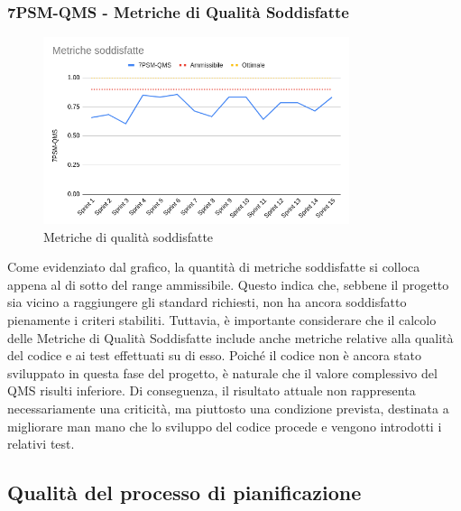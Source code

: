 \documentclass{article}
\begin{document}
        \subsubsection{7PSM-QMS - Metriche di Qualità Soddisfatte}
        \begin{figure}[H]
            \centering
            \includegraphics[width=0.8\textwidth]{../../../img/pdq_charts/chart6-metricheSoddisfatte.png}
            \caption{Metriche di qualità soddisfatte}
        \end{figure}
        Come evidenziato dal grafico, la quantità di metriche soddisfatte si colloca appena al di sotto del range ammissibile. Questo indica che, sebbene il progetto sia vicino a raggiungere gli standard richiesti, non ha ancora soddisfatto pienamente i criteri stabiliti.
        Tuttavia, è importante considerare che il calcolo delle Metriche di Qualità Soddisfatte include anche metriche relative alla qualità del codice e ai test effettuati su di esso. Poiché il codice non è ancora stato sviluppato in questa fase del progetto, è naturale che il valore complessivo del QMS risulti inferiore.
        Di conseguenza, il risultato attuale non rappresenta necessariamente una criticità, ma piuttosto una condizione prevista, destinata a migliorare man mano che lo sviluppo del codice procede e vengono introdotti i relativi test.


    \subsection{Qualità del processo di pianificazione}
\end{document}
